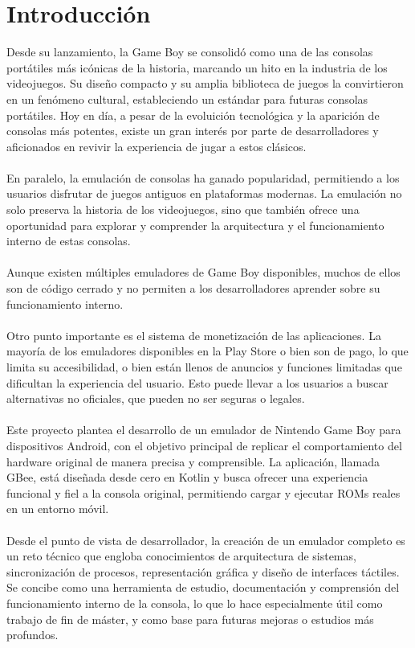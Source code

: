 \chapter{Introducción}
Desde su lanzamiento, la Game Boy se consolidó como una de las consolas portátiles más icónicas de la historia, marcando un hito en la industria de los videojuegos. Su diseño compacto y su amplia biblioteca de juegos la convirtieron en un fenómeno cultural, estableciendo un estándar para futuras consolas portátiles. Hoy en día, a pesar de la evoluición tecnológica y la aparición de consolas más potentes, existe un gran interés por parte de desarrolladores y aficionados en revivir la experiencia de jugar a estos clásicos.
\\\\
En paralelo, la emulación de consolas ha ganado popularidad, permitiendo a los usuarios disfrutar de juegos antiguos en plataformas modernas. La emulación no solo preserva la historia de los videojuegos, sino que también ofrece una oportunidad para explorar y comprender la arquitectura y el funcionamiento interno de estas consolas.
\\\\
Aunque existen múltiples emuladores de Game Boy disponibles, muchos de ellos son de código cerrado y no permiten a los desarrolladores aprender sobre su funcionamiento interno.
\\\\
Otro punto importante es el sistema de monetización de las aplicaciones. La mayoría de los emuladores disponibles en la Play Store o bien son de pago, lo que limita su accesibilidad, o bien están llenos de anuncios y funciones limitadas que dificultan la experiencia del usuario. Esto puede llevar a los usuarios a buscar alternativas no oficiales, que pueden no ser seguras o legales.
\\\\
Este proyecto plantea el desarrollo de un emulador de Nintendo Game Boy para dispositivos Android, con el objetivo principal de replicar el comportamiento del hardware original de manera precisa y comprensible. La aplicación, llamada GBee, está diseñada desde cero en Kotlin y busca ofrecer una experiencia funcional y fiel a la consola original, permitiendo cargar y ejecutar ROMs reales en un entorno móvil.
\\\\
Desde el punto de vista de desarrollador, la creación de un emulador completo es un reto técnico que engloba conocimientos de arquitectura de sistemas, sincronización de procesos, representación gráfica y diseño de interfaces táctiles. Se concibe como una herramienta de estudio, documentación y comprensión del funcionamiento interno de la consola, lo que lo hace especialmente útil como trabajo de fin de máster, y como base para futuras mejoras o estudios más profundos.

